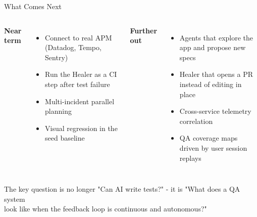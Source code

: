 \documentclass[aspectratio=169,10pt]{beamer}
\begin{document}
\begin{frame}{What Comes Next}
  \begin{columns}[T]
      \textbf{Near term}

      \vspace{0.5em}
      \begin{itemize}
        \setlength\itemsep{0.4em}
        \item Connect to real APM (Datadog, Tempo, Sentry)
        \item Run the Healer as a CI step after test failure
        \item Multi-incident parallel planning
        \item Visual regression in the seed baseline
      \end{itemize}

      \textbf{Further out}

      \vspace{0.5em}
      \begin{itemize}
        \setlength\itemsep{0.4em}
        \item Agents that explore the app and propose new specs
        \item Healer that opens a PR instead of editing in place
        \item Cross-service telemetry correlation
        \item QA coverage maps driven by user session replays
      \end{itemize}
  \end{columns}

  \vspace{1em}
  \begin{block}{The key question is no longer}
    \centering "Can AI write tests?" - it is "What does a QA system\\look like when the feedback loop is continuous and autonomous?"
  \end{block}
\end{frame}
\end{document}
